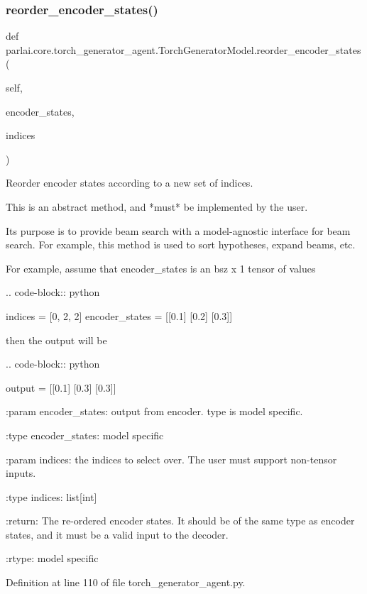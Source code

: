\subsubsection{\texorpdfstring{reorder\+\_\+encoder\+\_\+states()}{reorder\_encoder\_states()}}
{\footnotesize\ttfamily def parlai.\+core.\+torch\+\_\+generator\+\_\+agent.\+Torch\+Generator\+Model.\+reorder\+\_\+encoder\+\_\+states (\begin{DoxyParamCaption}\item[{}]{self,  }\item[{}]{encoder\+\_\+states,  }\item[{}]{indices }\end{DoxyParamCaption})}

\begin{DoxyVerb}Reorder encoder states according to a new set of indices.

This is an abstract method, and *must* be implemented by the user.

Its purpose is to provide beam search with a model-agnostic interface for
beam search. For example, this method is used to sort hypotheses,
expand beams, etc.

For example, assume that encoder_states is an bsz x 1 tensor of values

.. code-block:: python

    indices = [0, 2, 2]
    encoder_states = [[0.1]
              [0.2]
              [0.3]]

then the output will be

.. code-block:: python

    output = [[0.1]
      [0.3]
      [0.3]]

:param encoder_states:
    output from encoder. type is model specific.

:type encoder_states:
    model specific

:param indices:
    the indices to select over. The user must support non-tensor
    inputs.

:type indices: list[int]

:return:
    The re-ordered encoder states. It should be of the same type as
    encoder states, and it must be a valid input to the decoder.

:rtype:
    model specific
\end{DoxyVerb}
 

Definition at line 110 of file torch\+\_\+generator\+\_\+agent.\+py.


